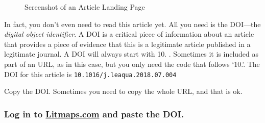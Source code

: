 \documentclass[
  letterpaper,
  DIV=11,
  numbers=noendperiod]{scrreprt}
\begin{document}
\begin{figure}

\caption{\label{fig-googlexsearch3}Screenshot of an Article Landing
Page}


\end{figure}%

In fact, you don't even need to read this article yet. All you need is
the DOI---the \emph{digital object identifier}. A DOI is a critical
piece of information about an article that provides a piece of evidence
that this is a legitimate article published in a legitimate journal. A
DOI will always start with 10. . Sometimes it is included as part of an
URL, as in this case, but you only need the code that follows `10.'. The
DOI for this article is \texttt{10.1016/j.leaqua.2018.07.004}

Copy the DOI. Sometimes you need to copy the whole URL, and that is ok.

\subsubsection{\texorpdfstring{Log in to
\href{https://www.litmaps.com/}{Litmaps.com} and paste the
DOI.}{Log in to Litmaps.com and paste the DOI.}}\label{log-in-to-litmaps.com-and-paste-the-doi.}
\end{document}
